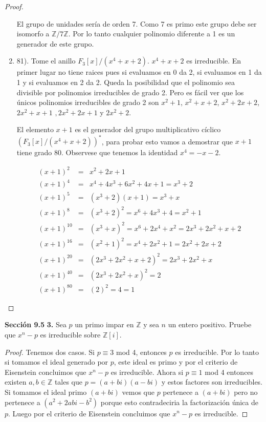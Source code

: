 \documentclass[letter,twoside,12pt]{article}
\begin{document}
\begin{proof}
\begin{enumerate}[label=\textbf{(\alph*)}]
El grupo de unidades sería de orden 7. Como 7 es primo este grupo debe ser isomorfo a $ \mathbb{Z}/7\mathbb{Z} $. Por lo tanto cualquier polinomio diferente a 1 es un generador de este grupo.

\item 81). Tome el anillo $ F_3[x]/(x^4+x+2) $. $ x^4+x+2 $ es irreducible. En primer lugar no tiene raices pues si evaluamos en 0 da 2, si evaluamos en 1 da 1 y si evaluamos en 2 da 2. Queda la posibilidad que el polinomio sea divisible por polinomios irreducibles de grado 2. Pero es fácil ver que los únicos polinomios irreducibles de grado 2 son $ x^2+1 $, $ x^2+x+2$, $x^2+2x+2 $, $ 2x^2+x+1 $ $, 2x^2+2x+1 $ y $ 2x^2+2 $.

El elemento $ x+1 $ es el generador del grupo multiplicativo cíclico $ (F_3[x]/(x^4+x+2))^* $, para probar esto vamos a demostrar que $ x+1 $ tiene grado 80. Observese que tenemos la identidad $ x^4=-x-2 $.

\begin{eqnarray}
(x+1)^2&=&x^2+2x+1 \nonumber
\\(x+1)^4&=& x^4+4x^3+6x^2+4x+1 = x^3+2\nonumber
\\(x+1)^5&=& (x^3+2)(x+1) = x^3+x\nonumber
\\(x+1)^8&=& (x^3+2)^2 = x^6+4x^3+4=x^2+1\nonumber
\\(x+1)^{10}&=& (x^3+x)^2 = x^6+2x^4+x^2=2x^3+2x^2+x+2 \nonumber
\\(x+1)^{16}&=& (x^2+1)^2 = x^4+2x^2+1=2x^2+2x+2 \nonumber
\\(x+1)^{20}&=& (2x^3+2x^2+x+2)^2 =2x^3+2x^2+x \nonumber
\\(x+1)^{40}&=& (2x^3+2x^2+x)^2 = 2 \nonumber
\\(x+1)^{80}&=& (2)^2 = 4 = 1 \nonumber
\end{eqnarray} 
\end{enumerate}

\end{proof}
\textbf{Sección 9.5} \textbf{3.} Sea $ p $ un primo impar en $ \mathbb{Z} $ y sea $ n $ un entero positivo. Pruebe que $ x^n-p $ es irreducible sobre $ \mathbb{Z}[i] $.

\begin{proof}
Tenemos dos casos. Si $ p \equiv 3 $ mod 4, entonces $ p $ es irreducible. Por lo tanto si tomamos el ideal generado por $ p $, este ideal es primo y por el criterio de Eisenstein concluimos que $ x^n-p $ es irreducible. Ahora si  $ p \equiv 1 $ mod 4 entonces existen $ a,b \in \mathbb{Z} $ tales que $ p = (a+bi)(a-bi) $ y estos factores son irreducibles. Si tomamos el ideal primo $ (a+bi) $ vemos que $ p $ pertenece a $ (a+bi) $ pero no pertenece a $ (a^2+2abi-b^2) $ porque esto contradeciria la factorización única de $ p $. Luego por el criterio de Eisenstein concluimos que $ x^n-p $ es irreducible.
\end{proof}
\end{document}
